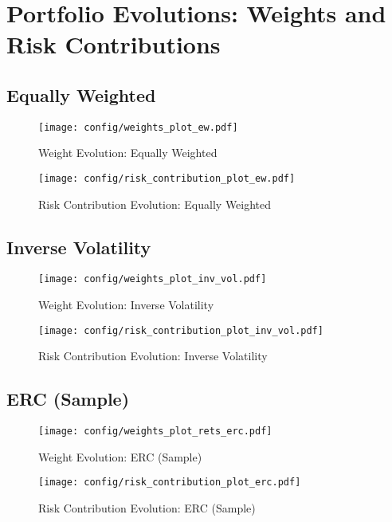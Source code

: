 \documentclass{article}
\begin{document}
\newpage

\appendix
\section{Portfolio Evolutions: Weights and Risk Contributions}

\subsection{Equally Weighted}
\begin{figure}[H]
    \centering
    \texttt{[image: config/weights\_plot\_ew.pdf]}
    \caption{Weight Evolution: Equally Weighted}
    \label{fig:weights_ew}
\end{figure}
\begin{figure}[H]
    \centering
    \texttt{[image: config/risk\_contribution\_plot\_ew.pdf]}
    \caption{Risk Contribution Evolution: Equally Weighted}
    \label{fig:risk_contribution_ew}
\end{figure}
\clearpage

\subsection{Inverse Volatility}
\begin{figure}[H]
    \centering
    \texttt{[image: config/weights\_plot\_inv\_vol.pdf]}
    \caption{Weight Evolution: Inverse Volatility}
    \label{fig:weights_inv_vol}
\end{figure}
\begin{figure}[H]
    \centering
    \texttt{[image: config/risk\_contribution\_plot\_inv\_vol.pdf]}
    \caption{Risk Contribution Evolution: Inverse Volatility}
    \label{fig:risk_contribution_inv_vol}
\end{figure}
\clearpage

\subsection{ERC (Sample)}
\begin{figure}[H]
    \centering
    \texttt{[image: config/weights\_plot\_rets\_erc.pdf]}
    \caption{Weight Evolution: ERC (Sample)}
    \label{fig:weights_erc_sample}
\end{figure}
\begin{figure}[H]
    \centering
    \texttt{[image: config/risk\_contribution\_plot\_erc.pdf]}
    \caption{Risk Contribution Evolution: ERC (Sample)}
    \label{fig:risk_contribution_erc_sample}
\end{figure}
\clearpage
\end{document}
